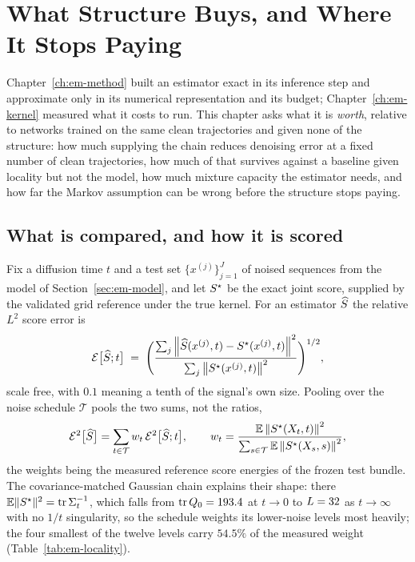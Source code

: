 
\chapter{What Structure Buys, and Where It Stops Paying}
\label{ch:em-results}

Chapter~\ref{ch:em-method} built an estimator exact in its inference step and
approximate only in its numerical representation and its budget;
Chapter~\ref{ch:em-kernel} measured what it costs to run. This chapter asks
what it is \emph{worth}, relative to networks trained on the same clean
trajectories and given none of the structure: how much supplying the chain
reduces denoising error at a fixed number of clean trajectories, how much of
that survives against a baseline given locality but not the model, how much
mixture capacity the estimator needs, and how far the Markov assumption can
be wrong before the structure stops paying.

\section{What is compared, and how it is scored}\label{sec:em-estimand}

Fix a diffusion time $t$ and a test set $\{x^{(j)}\}_{j=1}^{J}$ of noised
sequences from the model of Section~\ref{sec:em-model}, and let
$S^{\star}$ be the exact joint score, supplied by the validated grid
reference under the true kernel. For an estimator $\widehat{S}$ the
relative $L^2$ score error is
\begin{equation}
  \mathcal{E}\big[\widehat{S}; t\big]
  \;=\;
  \Bigg(
  \frac{\sum_{j}\left\lVert \widehat{S}(x^{(j)},t) - S^{\star}(x^{(j)},t) \right\rVert^2}
       {\sum_{j}\left\lVert S^{\star}(x^{(j)},t) \right\rVert^2}
  \Bigg)^{1/2},
  \label{eq:em-relerr}
\end{equation}
scale free, with $0.1$ meaning a tenth of the signal's own size. Pooling over
the noise schedule $\mathcal T$ pools the two sums, not the ratios,
\begin{equation}
  \mathcal{E}^2\big[\widehat{S}\big]
  = \sum_{t \in \mathcal{T}} w_t \,\mathcal{E}^2\big[\widehat{S}; t\big],
  \qquad
  w_t =
  \frac{\mathbb{E}\left\lVert S^{\star}(X_t,t) \right\rVert^2}{\sum_{s \in \mathcal{T}}\mathbb{E}\left\lVert S^{\star}(X_s,s) \right\rVert^2},
  \label{eq:em-pooling}
\end{equation}
the weights being the measured reference score energies of the frozen test
bundle. The covariance-matched Gaussian chain explains their shape: there
$\mathbb{E}\|S^\star\|^2 = \operatorname{tr}\Sigma_t^{-1}$, which falls from
$\operatorname{tr}Q_0 = 193.4$ at $t \to 0$ to $L = 32$ as
$t \to \infty$ with no $1/t$ singularity, so the schedule weights its
lower-noise levels most heavily; the four smallest of the twelve levels carry
$54.5\%$ of the measured weight (Table~\ref{tab:em-locality}).

